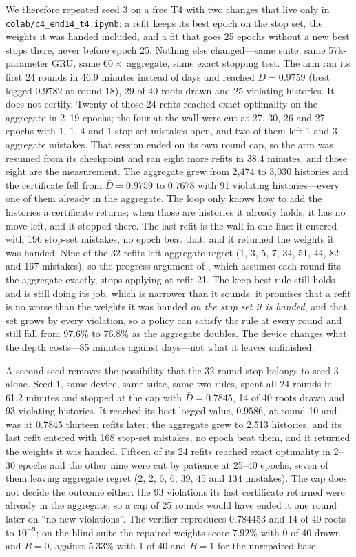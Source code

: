 \documentclass[conference]{IEEEtran}
\begin{document}
We therefore repeated seed 3 on a free T4 with two changes that live only in \texttt{colab/c4\_end14\_t4.ipynb}: a refit keeps its best epoch on the stop set, the weights it was handed included, and a fit that goes 25 epochs without a new best stops there, never before epoch 25. Nothing else changed---same suite, same 57k-parameter GRU, same $60\times$ aggregate, same exact stopping test. The arm ran its first 24 rounds in 46.9 minutes instead of days and reached $\bar D=0.9759$ (best logged $0.9782$ at round 18), 29 of 40 roots drawn and 25 violating histories. It does not certify. Twenty of those 24 refits reached exact optimality on the aggregate in 2--19 epochs; the four at the wall were cut at 27, 30, 26 and 27 epochs with 1, 1, 4 and 1 stop-set mistakes open, and two of them left 1 and 3 aggregate mistakes. That session ended on its own round cap, so the arm was resumed from its checkpoint and ran eight more refits in 38.4 minutes, and those eight are the measurement. The aggregate grew from 2{,}474 to 3{,}030 histories and the certificate fell from $\bar D=0.9759$ to $0.7678$ with 91 violating histories---every one of them already in the aggregate. The loop only knows how to add the histories a certificate returns; when those are histories it already holds, it has no move left, and it stopped there. The last refit is the wall in one line: it entered with 196 stop-set mistakes, no epoch beat that, and it returned the weights it was handed. Nine of the 32 refits left aggregate regret (1, 3, 5, 7, 34, 51, 44, 82 and 167 mistakes), so the progress argument of , which assumes each round fits the aggregate exactly, stops applying at refit 21. The keep-best rule still holds and is still doing its job, which is narrower than it sounds: it promises that a refit is no worse than the weights it was handed \emph{on the stop set it is handed}, and that set grows by every violation, so a policy can satisfy the rule at every round and still fall from 97.6\% to 76.8\% as the aggregate doubles. The device changes what the depth costs---85 minutes against days---not what it leaves unfinished.

A second seed removes the possibility that the 32-round stop belongs to seed 3 alone. Seed 1, same device, same suite, same two rules, spent all 24 rounds in 61.2 minutes and stopped at the cap with $\bar D=0.7845$, 14 of 40 roots drawn and 93 violating histories. It reached its best logged value, $0.9586$, at round 10 and was at $0.7845$ thirteen refits later; the aggregate grew to 2{,}513 histories, and its last refit entered with 168 stop-set mistakes, no epoch beat them, and it returned the weights it was handed. Fifteen of its 24 refits reached exact optimality in 2--30 epochs and the other nine were cut by patience at 25--40 epochs, seven of them leaving aggregate regret (2, 2, 6, 6, 39, 45 and 134 mistakes). The cap does not decide the outcome either: the 93 violations its last certificate returned were already in the aggregate, so a cap of 25 rounds would have ended it one round later on ``no new violations''. The verifier reproduces $0.784453$ and 14 of 40 roots to $10^{-9}$; on the blind suite the repaired weights score $7.92\%$ with 0 of 40 drawn and $B=0$, against $5.33\%$ with 1 of 40 and $B=1$ for the unrepaired base.
\end{document}
